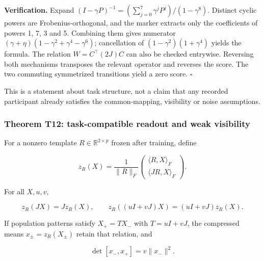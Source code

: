 \documentclass[11pt,a4paper]{article}
\begin{document}
\textbf{Verification.} Expand
\((I-\gamma P)^{-1}=(\sum_{j=0}^7\gamma^jP^j)/(1-\gamma^8)\). Distinct
cyclic powers are Frobenius-orthogonal, and the marker extracts only the
coefficients of powers 1, 7, 3 and 5. Combining them gives numerator
\((\gamma+\eta)(1-\gamma^2+\gamma^4-\gamma^6)\); cancellation of
\((1-\gamma^2)(1+\gamma^4)\) yields the formula. The relation
\(W=C^\top(2J)C\) can also be checked entrywise. Reversing both
mechanisms transposes the relevant operator and reverses the score. The
two commuting symmetrized transitions yield a zero score. \(\square\)

This is a statement about task structure, not a claim that any recorded
participant already satisfies the common-mapping, visibility or noise
assumptions.

\subsubsection{Theorem T12: task-compatible readout and weak
visibility}\label{theorem-t12-task-compatible-readout-and-weak-visibility}

\par
\noindent\begin{minipage}{\linewidth}

For a nonzero template \(R\in\mathbb R^{2\times p}\) frozen after
training, define

\[
z_R(X)=\frac1{\|R\|_F}
\begin{pmatrix}\langle R,X\rangle_F\\
\langle JR,X\rangle_F\end{pmatrix}.
\]

\end{minipage}\par

\par
\noindent\begin{minipage}{\linewidth}

For all \(X,u,v\),

\[
z_R(JX)=Jz_R(X),\qquad
z_R((uI+vJ)X)=(uI+vJ)z_R(X).
\]

\end{minipage}\par

\par
\noindent\begin{minipage}{\linewidth}

If population patterns satisfy \(X_+=TX_-\) with \(T=uI+vJ\), the
compressed means \(x_\pm=z_R(X_\pm)\) retain that relation, and

\[
\det[x_-,x_+]=v\|x_-\|^2.
\]

\end{minipage}\par
\end{document}
